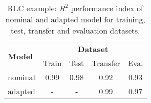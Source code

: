 \documentclass{article}
\begin{document}
\begin{table}[!tb]
\centering
\begin{tabular}{l | c  c  c  c}
\multirow{2}{*}{\textbf{Model}} & \multicolumn{4}{c}{\textbf{Dataset}} \\
                & Train      & Test       & Transfer & Eval       \\ %
\hline
nominal         & 0.99       & 0.98       & 0.92     & 0.93 \\
adapted         & -          & -          & 0.99     & 0.97  \\
\hline
\end{tabular}
\caption{RLC example: $R^2$  performance index  of  nominal and adapted model for training, test, transfer and evaluation datasets.}
\label{tab:RLC_performance}
\end{table}
\end{document}
